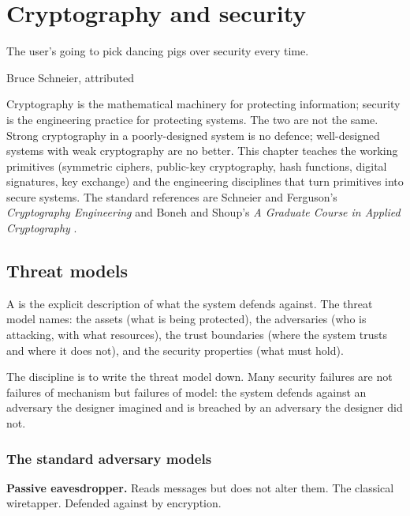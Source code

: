 \chapter{Cryptography and security}
\label{vol07:ch12}

\epigraph{The user's going to pick dancing pigs over security every time.}{Bruce Schneier, attributed}


\noindent
Cryptography is the mathematical machinery for protecting information; security is the engineering practice for protecting systems. The two are not the same. Strong cryptography in a poorly-designed system is no defence; well-designed systems with weak cryptography are no better. This chapter teaches the working primitives (symmetric ciphers, public-key cryptography, hash functions, digital signatures, key exchange) and the engineering disciplines that turn primitives into secure systems. The standard references are Schneier and Ferguson's \emph{Cryptography Engineering} \cite{text:ferguson-schneier-kohno} and Boneh and Shoup's \emph{A Graduate Course in Applied Cryptography} \cite{text:boneh-shoup}.

\section{Threat models}

A  is the explicit description of what the system defends against. The threat model names: the assets (what is being protected), the adversaries (who is attacking, with what resources), the trust boundaries (where the system trusts and where it does not), and the security properties (what must hold).

The discipline is to write the threat model down. Many security failures are not failures of mechanism but failures of model: the system defends against an adversary the designer imagined and is breached by an adversary the designer did not.

\subsection{The standard adversary models}

\textbf{Passive eavesdropper.} Reads messages but does not alter them. The classical wiretapper. Defended against by encryption.

